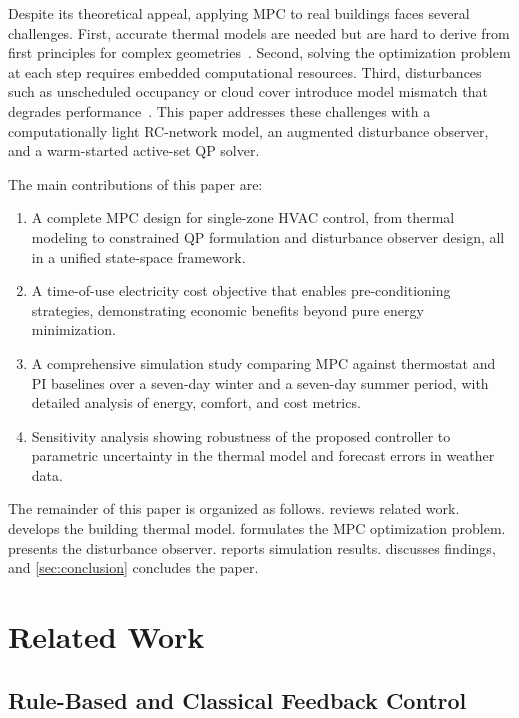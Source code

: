 \documentclass[conference,a4paper]{IEEEtran}[2015/08/26]
\begin{document}
Despite its theoretical appeal, applying MPC to real buildings faces
several challenges. First, accurate thermal models are needed but are
hard to derive from first principles for complex geometries~\cite{Privara2013}.
Second, solving the optimization problem at each step requires embedded
computational resources. Third, disturbances such as unscheduled
occupancy or cloud cover introduce model mismatch that degrades
performance~\cite{Afram2014}. This paper addresses these challenges with
a computationally light RC-network model, an augmented disturbance
observer, and a warm-started active-set QP solver.

The main contributions of this paper are:
\begin{enumerate}
  \item A complete MPC design for single-zone HVAC control, from
    thermal modeling to constrained QP formulation and disturbance
    observer design, all in a unified state-space framework.
  \item A time-of-use electricity cost objective that enables
    pre-conditioning strategies, demonstrating economic benefits beyond
    pure energy minimization.
  \item A comprehensive simulation study comparing MPC against thermostat
    and PI baselines over a seven-day winter and a seven-day summer
    period, with detailed analysis of energy, comfort, and cost metrics.
  \item Sensitivity analysis showing robustness of the proposed
    controller to parametric uncertainty in the thermal model and
    forecast errors in weather data.
\end{enumerate}

The remainder of this paper is organized as follows.
 reviews related work.
 develops the building thermal model.
 formulates the MPC optimization problem.
 presents the disturbance observer.
 reports simulation results.
 discusses findings, and
\cref{sec:conclusion} concludes the paper.

\section{Related Work}
\label{sec:related}

\subsection{Rule-Based and Classical Feedback Control}
\end{document}
